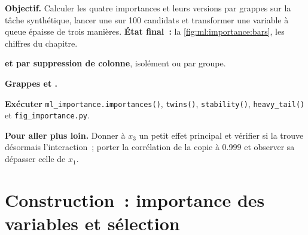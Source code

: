 \begin{tutorial}
\textbf{Objectif.} Calculer les quatre importances et leurs versions par grappes sur la tâche synthétique, lancer une 
sur 100 candidats et transformer une variable à queue épaisse de trois manières. \textbf{État final~:} la \cref{fig:ml:importance:bars},
les chiffres du chapitre.
\begin{tutsteps}
\item \textbf{ et par suppression de colonne}, isolément ou par groupe.
\label{lst:ml:importance:perm}
\item \textbf{Grappes et .}
\label{lst:ml:importance:stab}
\item \textbf{Exécuter} \texttt{ml\_importance.importances()}, \texttt{twins()}, \texttt{stability()},
\texttt{heavy\_tail()} et \texttt{fig\_importance.py}.
\end{tutsteps}
\textbf{Pour aller plus loin.} Donner à $x_3$ un petit effet principal et vérifier si la  trouve désormais
l'interaction~; porter la corrélation de la copie à 0.999 et observer sa  dépasser celle de $x_1$.
\end{tutorial}

\section{Construction~: importance des variables et sélection}\label{bld:ml:feature-engineering-selection-and-importance:featimp}

